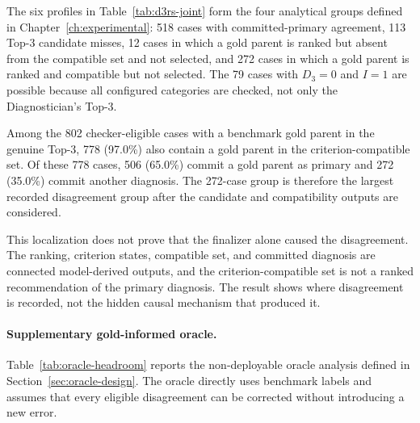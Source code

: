 
The six profiles in Table~\ref{tab:d3rs-joint} form the four analytical groups defined in Chapter~\ref{ch:experimental}: 518 cases with committed-primary agreement, 113 Top-3 candidate misses, 12 cases in which a gold parent is ranked but absent from the compatible set and not selected, and 272 cases in which a gold parent is ranked and compatible but not selected. The 79 cases with $D_3=0$ and $I=1$ are possible because all configured categories are checked, not only the Diagnostician's Top-3.

Among the 802 checker-eligible cases with a benchmark gold parent in the genuine Top-3, 778 (97.0\%) also contain a gold parent in the criterion-compatible set. Of these 778 cases, 506 (65.0\%) commit a gold parent as primary and 272 (35.0\%) commit another diagnosis. The 272-case group is therefore the largest recorded disagreement group after the candidate and compatibility outputs are considered.

This localization does not prove that the finalizer alone caused the disagreement. The ranking, criterion states, compatible set, and committed diagnosis are connected model-derived outputs, and the criterion-compatible set is not a ranked recommendation of the primary diagnosis. The result shows where disagreement is recorded, not the hidden causal mechanism that produced it.

\paragraph{Supplementary gold-informed oracle.}
Table~\ref{tab:oracle-headroom} reports the non-deployable oracle analysis defined in Section~\ref{sec:oracle-design}. The oracle directly uses benchmark labels and assumes that every eligible disagreement can be corrected without introducing a new error.

